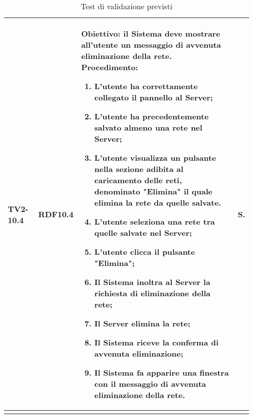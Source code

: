 \begin{longtable}{|C{.15\textwidth}|C{.13\textwidth}|m{.65\textwidth}|C{.08\textwidth}|}
TV2-10.4 & RDF10.4 &
	\textbf{Obiettivo}: il Sistema deve mostrare all'utente un messaggio di avvenuta eliminazione della rete. \newline
	\textbf{Procedimento}:
	\begin{enumerate}
		\item L'utente ha correttamente collegato il pannello al Server;
		\item L'utente ha precedentemente salvato almeno una rete nel Server;
		\item L'utente visualizza un pulsante nella sezione adibita al caricamento delle reti, denominato "Elimina" il quale elimina la rete da quelle salvate.
		\item L'utente seleziona una rete tra quelle salvate nel Server;
		\item L'utente clicca il pulsante "Elimina";
		\item Il Sistema inoltra al Server la richiesta di eliminazione della rete;
		\item Il Server elimina la rete;
		\item Il Sistema riceve la conferma di avvenuta eliminazione;
		\item Il Sistema fa apparire una finestra con il messaggio di avvenuta eliminazione della rete.
	\end{enumerate}
	& S. \\
\hline








\caption{Test di validazione previsti}
\label{testvalidazioneprevisti}
\end{longtable}